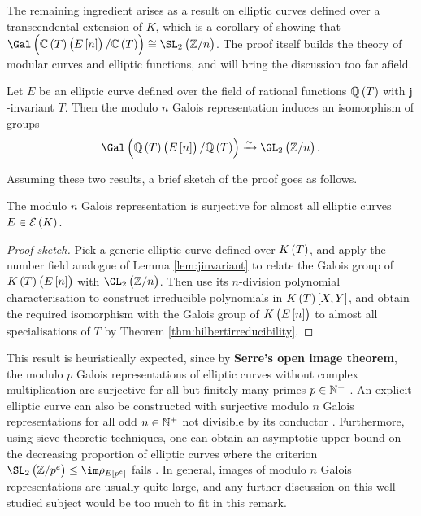 The remaining ingredient arises as a result on elliptic curves defined over a transcendental extension of $ K $, which is a corollary of showing that $ \Gal\br{\CC\br{T}\br{E\sbr{n}} / \CC\br{T}} \cong \SL_2\br{\ZZ / n} $. The proof itself builds the theory of modular curves and elliptic functions, and will bring the discussion too far afield.

\begin{lemma}
\label{lem:jinvariant}
Let $ E $ be an elliptic curve defined over the field of rational functions $ \QQ\br{T} $ with $ \mathrm{j} $-invariant $ T $. Then the modulo $ n $ Galois representation induces an isomorphism of groups
$$ \Gal\br{\QQ\br{T}\br{E\sbr{n}} / \QQ\br{T}} \xrightarrow{\sim} \GL_2\br{\ZZ / n}. $$
\end{lemma}

Assuming these two results, a brief sketch of the proof goes as follows.

\begin{proposition}
\label{prop:galoisrepresentation}
The modulo $ n $ Galois representation is surjective for almost all elliptic curves $ E \in \EEE\br{K} $.
\end{proposition}

\begin{proof}[Proof sketch]
Pick a generic elliptic curve defined over $ K\br{T} $, and apply the number field analogue of Lemma \ref{lem:jinvariant} to relate the Galois group of $ K\br{T}\br{E\sbr{n}} $ with $ \GL_2\br{\ZZ / n} $. Then use its $ n $-division polynomial characterisation to construct irreducible polynomials in $ K\br{T}\sbr{X, Y} $, and obtain the required isomorphism with the Galois group of $ K\br{E\sbr{n}} $ to almost all specialisations of $ T $ by Theorem \ref{thm:hilbertirreducibility}.
\end{proof}

\begin{remark}
This result is heuristically expected, since by \textbf{Serre's open image theorem}, the modulo $ p $ Galois representations of elliptic curves without complex multiplication are surjective for all but finitely many primes $ p \in \mathbb{N}^+ $ \cite[Theorem III.7.9]{Sil09}. An explicit elliptic curve can also be constructed with surjective modulo $ n $ Galois representations for all odd $ n \in \mathbb{N}^+ $ not divisible by its conductor \cite[Section 10.4]{Ser89}. Furthermore, using sieve-theoretic techniques, one can obtain an asymptotic upper bound on the decreasing proportion of elliptic curves where the criterion $ \SL_2\br{\ZZ / p^e} \le \im \rho_{E\sbr{p^e}} $ fails \cite[Proposition 5.6]{Zyw18}. In general, images of modulo $ n $ Galois representations are usually quite large, and any further discussion on this well-studied subject would be too much to fit in this remark.
\end{remark}

